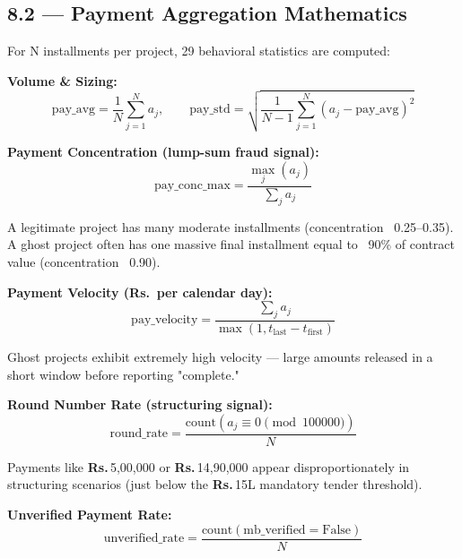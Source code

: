 \documentclass[11pt,a4paper]{article}
\DeclareRobustCommand{\INR}{\textbf{Rs.\,}}
\DeclareRobustCommand{\INR}{₹}
\begin{document}
\subsection{8.2 --- Payment Aggregation Mathematics}

For N installments per project, 29 behavioral statistics are computed:

\textbf{Volume \& Sizing:}
\[ \text{pay\_avg} = \frac{1}{N}\sum_{j=1}^{N} a_j, \qquad \text{pay\_std} = \sqrt{\frac{1}{N-1}\sum_{j=1}^{N}(a_j - \text{pay\_avg})^2} \]

\textbf{Payment Concentration (lump-sum fraud signal):}
\[ \text{pay\_conc\_max} = \frac{\max_j(a_j)}{\sum_j a_j} \]

\begin{tcolorbox}[colback=blue!4!white,colframe=blue!60!black,arc=1.5mm,boxrule=0.7pt,left=8pt,right=8pt,top=6pt,bottom=6pt]
A legitimate project has many moderate installments (concentration ~0.25–0.35). A ghost project often has one massive final installment equal to ~90\% of contract value (concentration ~0.90).\\
\end{tcolorbox}

\textbf{Payment Velocity (\INR{} per calendar day):}
\[ \text{pay\_velocity} = \frac{\sum_j a_j}{\max(1, t_\text{last} - t_\text{first})} \]

\begin{tcolorbox}[colback=blue!4!white,colframe=blue!60!black,arc=1.5mm,boxrule=0.7pt,left=8pt,right=8pt,top=6pt,bottom=6pt]
Ghost projects exhibit extremely high velocity --- large amounts released in a short window before reporting "complete."\\
\end{tcolorbox}

\textbf{Round Number Rate (structuring signal):}
\[ \text{round\_rate} = \frac{\text{count}(a_j \equiv 0 \pmod{100000})}{N} \]

\begin{tcolorbox}[colback=blue!4!white,colframe=blue!60!black,arc=1.5mm,boxrule=0.7pt,left=8pt,right=8pt,top=6pt,bottom=6pt]
Payments like \INR{}5,00,000 or \INR{}14,90,000 appear disproportionately in structuring scenarios (just below the \INR{}15L mandatory tender threshold).\\
\end{tcolorbox}

\textbf{Unverified Payment Rate:}
\[ \text{unverified\_rate} = \frac{\text{count}(\text{mb\_verified} = \text{False})}{N} \]
\end{document}
